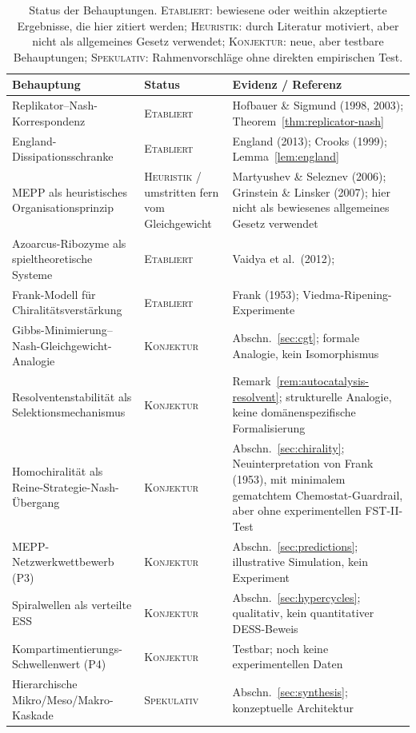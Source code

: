 \documentclass[12pt,a4paper]{article}
\theoremstyle{remark}
\begin{document}
\begin{table}[htbp]
\centering
\caption{Status der Behauptungen. \textsc{Etabliert}: bewiesene oder weithin akzeptierte Ergebnisse, die hier zitiert werden; \textsc{Heuristik}: durch Literatur motiviert, aber nicht als allgemeines Gesetz verwendet; \textsc{Konjektur}: neue, aber testbare Behauptungen; \textsc{Spekulativ}: Rahmenvorschläge ohne direkten empirischen Test.}
\label{tab:status-claims}
\small
\setlength{\tabcolsep}{4pt}
\begin{tabularx}{\textwidth}{@{}>{\raggedright\arraybackslash}p{}>{\raggedright\arraybackslash}p{}>{\raggedright\arraybackslash}X@{}}
\toprule
\textbf{Behauptung} & \textbf{Status} & \textbf{Evidenz / Referenz} \\
\midrule
Replikator--Nash-Korrespondenz & \textsc{Etabliert} & Hofbauer \& Sigmund (1998, 2003); Theorem~\ref{thm:replicator-nash} \\
England-Dissipationsschranke & \textsc{Etabliert} & England (2013); Crooks (1999); Lemma~\ref{lem:england} \\
MEPP als heuristisches Organisationsprinzip & \textsc{Heuristik} / umstritten fern vom Gleichgewicht & Martyushev \& Seleznev (2006); Grinstein \& Linsker (2007); hier nicht als bewiesenes allgemeines Gesetz verwendet \\
Azoarcus-Ribozyme als spieltheoretische Systeme & \textsc{Etabliert} & Vaidya et al.\ (2012);~\citet{SieversKiedrowski1994} \\
Frank-Modell für Chiralitätsverstärkung & \textsc{Etabliert} & Frank (1953); Viedma-Ripening-Experimente \\
Gibbs-Minimierung--Nash-Gleichgewicht-Analogie & \textsc{Konjektur} & Abschn.~\ref{sec:cgt}; formale Analogie, kein Isomorphismus \\
Resolventenstabilität als Selektionsmechanismus & \textsc{Konjektur} & Remark~\ref{rem:autocatalysis-resolvent}; strukturelle Analogie, keine domänenspezifische Formalisierung \\
Homochiralität als Reine-Strategie-Nash-Übergang & \textsc{Konjektur} & Abschn.~\ref{sec:chirality}; Neuinterpretation von Frank (1953), mit minimalem gematchtem Chemostat-Guardrail, aber ohne experimentellen FST-II-Test \\
MEPP-Netzwerkwettbewerb (P3) & \textsc{Konjektur} & Abschn.~\ref{sec:predictions}; illustrative Simulation, kein Experiment \\
Spiralwellen als verteilte ESS & \textsc{Konjektur} & Abschn.~\ref{sec:hypercycles}; qualitativ, kein quantitativer DESS-Beweis \\
Kompartimentierungs-Schwellenwert (P4) & \textsc{Konjektur} & Testbar; noch keine experimentellen Daten \\
Hierarchische Mikro/Meso/Makro-Kaskade & \textsc{Spekulativ} & Abschn.~\ref{sec:synthesis}; konzeptuelle Architektur \\
\bottomrule
\end{tabularx}
\end{table}
\end{document}
